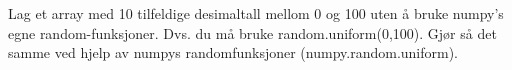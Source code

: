 %
%
Lag et array med 10 tilfeldige desimaltall mellom 0 og 100
uten å bruke numpy's egne random-funksjoner.
Dvs. du må bruke random.uniform(0,100).
Gjør så det samme ved hjelp av numpys randomfunksjoner (numpy.random.uniform).

